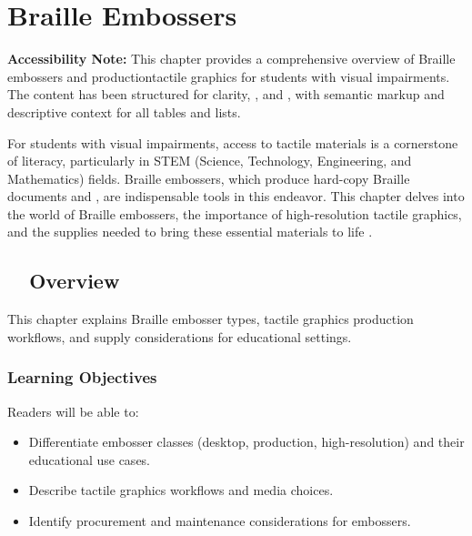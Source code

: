\chapter{Braille Embossers}\label{ch4:braille-embossers}

\raggedright

\begin{raggedright}
	\textbf{Accessibility Note:} This chapter provides a comprehensive overview of Braille embossers and  productiontactile graphics for students with visual impairments. The content has been structured for clarity, , and , with semantic markup and descriptive context for all tables and lists.
\end{raggedright}

For students with visual impairments, access to tactile materials is a cornerstone of literacy, particularly in STEM (Science, Technology, Engineering, and Mathematics) fields. Braille embossers, which produce hard-copy Braille documents and , are indispensable tools in this endeavor. This chapter delves into the world of Braille embossers, the importance of high-resolution tactile graphics, and the supplies needed to bring these essential materials to life \cite{Perkins, TactileView, CreatingTactileGraphics, AELData}.

\section{~~Overview}\label{chap4:overview}
This chapter explains Braille embosser types, tactile graphics production workflows, and supply considerations for educational settings.

\subsection{Learning Objectives}\label{chap4:learning-objectives}
Readers will be able to:
\begin{itemize}
\item Differentiate embosser classes (desktop, production, high-resolution) and their educational use cases.
\item Describe tactile graphics workflows and media choices.
\item Identify procurement and maintenance considerations for embossers.
\end{itemize}

